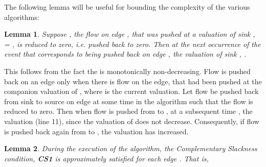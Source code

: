 \documentclass[11pt]{article}
\newenvironment{proof}{\par\noindent{\bf Proof:}}{\mbox{}\hfill\\}
\newtheorem{lemma}{Lemma}[section]
\newcounter{rem}
\begin{document}
The following lemma will be useful for bounding the complexity of the various algorithms:
\begin{lemma}
\label{beta-increase}
Suppose , the flow on edge , 
that was pushed at a valuation of sink ,  
=  , is reduced to zero, 
i.e. pushed back to zero. 
Then at the next occurrence of the event that corresponds to  being 
pushed back  on edge ,  
the valuation of sink , .
\end{lemma}
\begin{proof}
This follows from the fact the  is monotonically non-decreasing.
Flow is pushed back on an edge 
only when there is flow on the edge,  
that had been pushed at the companion valuation 
of , where  is the current valuation.
Let flow be pushed back from sink  to source  on edge  
at some time  in the algorithm such that the flow is reduced to zero.
Then when flow is pushed from  to , at a subsequent
time , the  valuation   (line 11), 
since the valuation
of  does not decrease. Consequently, if flow is pushed back again
from  to , the valuation has  increased.
\end{proof}

\begin{lemma}
During the execution of the algorithm,
the Complementary Slackness condition, {\bf  CS1 }
is approximately satisfied for each edge . That is, 
 
\label{lemma_primalCS}
\end{lemma}
\end{document}
